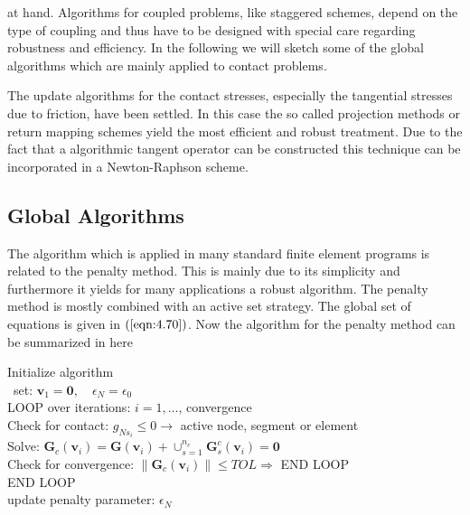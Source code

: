 at hand. Algorithms for coupled problems, like staggered schemes, depend on the type of coupling and thus have to be designed with special care regarding robustness and efficiency. In the following we will sketch some of the global algorithms which are mainly applied to contact problems.

The update algorithms for the contact stresses, especially the tangential stresses due to friction, have been settled. In this case the so called projection methods or return mapping schemes yield the most efficient and robust treatment. Due to the fact that a algorithmic tangent operator can be constructed this technique can be incorporated in a Newton-Raphson scheme.

\subsection{ Global Algorithms}

The algorithm which is applied in many standard finite element programs is related to the penalty method. This is mainly due to its simplicity and furthermore it yields for many applications a robust algorithm. The penalty method is mostly combined with an active set strategy. The global set of equations is given in $ (\ref{eqn:4.70}) $. Now the algorithm for the penalty method can be summarized in here \\
\begin{framed}
Initialize algorithm \\
\ set: $ \mathbf{v}_{1}=\mathbf{0}, \quad \epsilon_{N}=\epsilon_{0} $\\
\hspace*{6mm} LOOP over iterations: $ i=1, \ldots $, convergence \\
\hspace*{10mm} Check for contact: $ g_{N s_{i}} \leq 0 \rightarrow $ active node, segment or element \\
 \hspace*{10mm} Solve: $ \mathbf{G}_{c}\left(\mathbf{v}_{i}\right)=\mathbf{G}\left(\mathbf{v}_{i}\right)+\cup_{s=1}^{n_{c}} \mathbf{G}_{s}^{c}\left(\mathbf{v}_{i}\right)=\mathbf{0} $ \\
 \hspace*{10mm} Check for convergence: $ \left\|\mathbf{G}_{c}\left(\mathbf{v}_{i}\right)\right\| \leq T O L \Rightarrow $ END LOOP \\
\hspace*{6mm}  END LOOP 
\\ update penalty parameter: $ \epsilon_{N} $
\end{framed}


